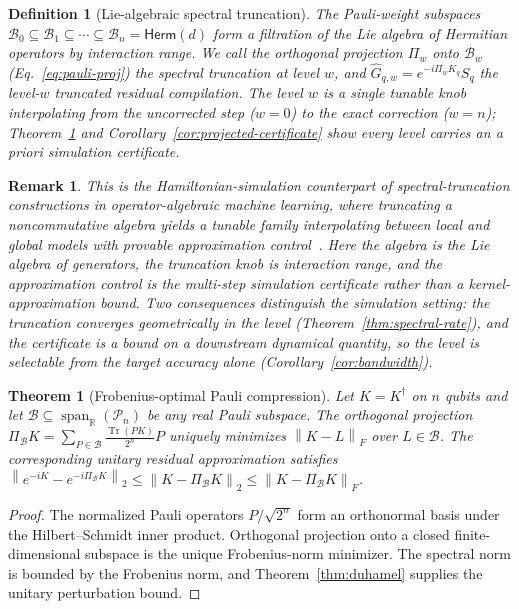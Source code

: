 \documentclass[aps,prresearch,reprint,superscriptaddress,nofootinbib,amsmath,amssymb]{revtex4-2}
\newcommand{\norm}[1]{\left\lVert #1 \right\rVert}
\newcommand{\Tr}{\operatorname{Tr}}
\newcommand{\Span}{\operatorname{span}}
\newcommand{\cB}{\mathcal{B}}
\newcommand{\cP}{\mathcal{P}}
\newtheorem{theorem}{Theorem}
\newtheorem{definition}{Definition}
\newtheorem{remark}{Remark}
\begin{document}
\begin{definition}[Lie-algebraic spectral truncation]
\label{def:spectral-truncation}
The Pauli-weight subspaces $\cB_0\subseteq\cB_1\subseteq\cdots\subseteq\cB_n=\mathsf{Herm}(d)$ form a filtration of the Lie algebra of Hermitian operators by interaction range. We call the orthogonal projection $\Pi_w$ onto $\cB_w$ (Eq.~\eqref{eq:pauli-proj}) the \emph{spectral truncation at level $w$}, and $\widehat G_{q,w}=e^{-i\Pi_wK_q}S_q$ the level-$w$ truncated residual compilation. The level $w$ is a single tunable knob interpolating from the uncorrected step ($w=0$) to the exact correction ($w=n$); Theorem~\ref{thm:pauli-projection} and Corollary~\ref{cor:projected-certificate} show every level carries an \emph{a priori} simulation certificate.
\end{definition}

\begin{remark}
This is the Hamiltonian-simulation counterpart of spectral-truncation constructions in operator-algebraic machine learning, where truncating a noncommutative algebra yields a tunable family interpolating between local and global models with provable approximation control~\cite{hashimoto2024spectral,hashimoto2023rkhm}. Here the algebra is the Lie algebra of generators, the truncation knob is interaction range, and the approximation control is the multi-step simulation certificate rather than a kernel-approximation bound. Two consequences distinguish the simulation setting: the truncation converges \emph{geometrically} in the level (Theorem~\ref{thm:spectral-rate}), and the certificate is a bound on a downstream dynamical quantity, so the level is selectable from the target accuracy alone (Corollary~\ref{cor:bandwidth}).
\end{remark}

\begin{theorem}[Frobenius-optimal Pauli compression]
\label{thm:pauli-projection}
Let $K=K^\dagger$ on $n$ qubits and let $\cB\subseteq\Span_\mathbb{R}(\cP_n)$ be any real Pauli subspace. The orthogonal projection $\Pi_\cB K=\sum_{P\in\cB}\frac{\Tr(PK)}{2^n}P$ uniquely minimizes $\norm{K-L}_F$ over $L\in\cB$. The corresponding unitary residual approximation satisfies $\norm{e^{-iK}-e^{-i\Pi_\cB K}}_2\leq\norm{K-\Pi_\cB K}_2\leq\norm{K-\Pi_\cB K}_F$.
\end{theorem}

\begin{proof}
The normalized Pauli operators $P/\sqrt{2^n}$ form an orthonormal basis under the Hilbert--Schmidt inner product. Orthogonal projection onto a closed finite-dimensional subspace is the unique Frobenius-norm minimizer. The spectral norm is bounded by the Frobenius norm, and Theorem~\ref{thm:duhamel} supplies the unitary perturbation bound.
\end{proof}
\end{document}
